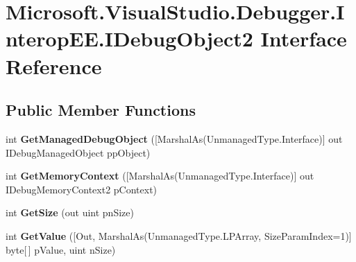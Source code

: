 \hypertarget{interface_microsoft_1_1_visual_studio_1_1_debugger_1_1_interop_e_e_1_1_i_debug_object2}{\section{Microsoft.\+Visual\+Studio.\+Debugger.\+Interop\+E\+E.\+I\+Debug\+Object2 Interface Reference}
\label{interface_microsoft_1_1_visual_studio_1_1_debugger_1_1_interop_e_e_1_1_i_debug_object2}
}
\subsection*{Public Member Functions}
\begin{DoxyCompactItemize}
\item 
\hypertarget{interface_microsoft_1_1_visual_studio_1_1_debugger_1_1_interop_e_e_1_1_i_debug_object2_afb98a87d3c44098feeaec31faf06fd67}{int {\bfseries Get\+Managed\+Debug\+Object} (\mbox{[}Marshal\+As(Unmanaged\+Type.\+Interface)\mbox{]} out I\+Debug\+Managed\+Object pp\+Object)}\label{interface_microsoft_1_1_visual_studio_1_1_debugger_1_1_interop_e_e_1_1_i_debug_object2_afb98a87d3c44098feeaec31faf06fd67}

\item 
\hypertarget{interface_microsoft_1_1_visual_studio_1_1_debugger_1_1_interop_e_e_1_1_i_debug_object2_ab9fb5b853e6c44fb7339308d09e0f5e5}{int {\bfseries Get\+Memory\+Context} (\mbox{[}Marshal\+As(Unmanaged\+Type.\+Interface)\mbox{]} out I\+Debug\+Memory\+Context2 p\+Context)}\label{interface_microsoft_1_1_visual_studio_1_1_debugger_1_1_interop_e_e_1_1_i_debug_object2_ab9fb5b853e6c44fb7339308d09e0f5e5}

\item 
\hypertarget{interface_microsoft_1_1_visual_studio_1_1_debugger_1_1_interop_e_e_1_1_i_debug_object2_a4939bac49bf02aab6b8c56abfa8fafa9}{int {\bfseries Get\+Size} (out uint pn\+Size)}\label{interface_microsoft_1_1_visual_studio_1_1_debugger_1_1_interop_e_e_1_1_i_debug_object2_a4939bac49bf02aab6b8c56abfa8fafa9}

\item 
\hypertarget{interface_microsoft_1_1_visual_studio_1_1_debugger_1_1_interop_e_e_1_1_i_debug_object2_a35b7d4ab99346a04029d1cb118fffba3}{int {\bfseries Get\+Value} (\mbox{[}Out, Marshal\+As(Unmanaged\+Type.\+L\+P\+Array, Size\+Param\+Index=1)\mbox{]} byte\mbox{[}$\,$\mbox{]} p\+Value, uint n\+Size)}\label{interface_microsoft_1_1_visual_studio_1_1_debugger_1_1_interop_e_e_1_1_i_debug_object2_a35b7d4ab99346a04029d1cb118fffba3}


\end{DoxyCompactItemize}
